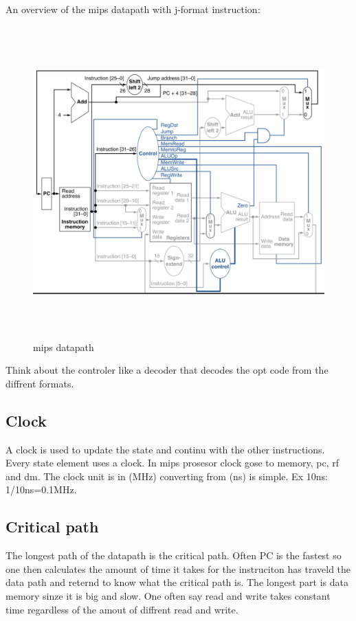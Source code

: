 \documentclass{article}
\begin{document}
\newpage

An overview of the mips datapath with j-format instruction:
\begin{figure}[h]
    \vspace{10mm}
    \centering
    \includegraphics[width=16cm, height=12cm]{image/mips-datapath.png} 
    \caption{mips datapath}
    \label{mips-datapath}
\end{figure}

Think about the controler like a decoder that decodes the opt code from the diffrent formats.

\newpage

\subsection{Clock}
A clock is used to update the state and continu with the other instructions. Every state element uses
a clock. In mips prosesor clock gose to memory, pc, rf and dm. The clock unit is in (MHz) converting
from (ns) is simple. Ex 10ns: 1/10ns=0.1MHz.

\subsection{Critical path}
The longest path of the datapath is the critical path. Often PC is the fastest so one then calculates the
amount of time it takes for the instruciton has traveld the data path and reternd to know what the
critical path is. The longest part is data memory sinze it is big and slow. One often say read and write
takes constant time regardless of the amout of diffrent read and write.
\end{document}
